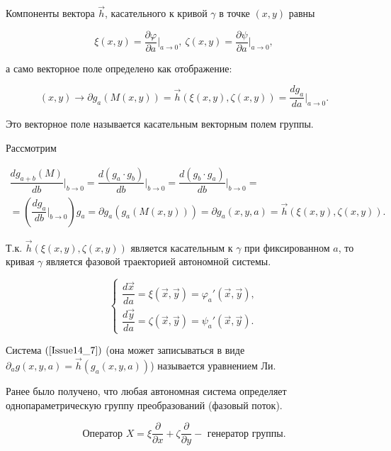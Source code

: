 Компоненты вектора $\vec{h}$, касательного к кривой $\gamma$ в точке $(x,y)$ равны

\[ \xi(x,y) = \dfrac{\partial \varphi}{\partial a}\bigg|_{a \rightarrow 0},\ \zeta(x,y) = \dfrac{\partial \psi }{\partial a}\bigg|_{a \rightarrow 0}, \]

а само векторное поле определено как отображение:

\begin{equation}
	(x,y) \rightarrow \partial g_a(M(x,y)) = \vec{h}(\xi(x,y), \zeta(x,y)) = \dfrac{dg_a}{da}\bigg|_{a \rightarrow 0}.
	\label{Issue14_6}
\end{equation}

Это векторное поле называется $\textbf{касательным векторным полем}$ группы.

Рассмотрим 

\begin{equation}
	\begin{gathered}
		\dfrac{dg_{a+b}(M)}{db}\bigg|_{b\rightarrow 0} = \dfrac{d(g_a\cdot g_b)}{db}\bigg|_{b\rightarrow0} = \dfrac{d(g_b\cdot g_a)}{db}\bigg|_{b\rightarrow 0} = \\
		= \left(\dfrac{dg_a}{db}\bigg|_{b\rightarrow 0}\right)g_a = \partial g_a (g_a(M(x,y))) = \partial g_a (x,y,a) = \vec{h}(\xi(x,y), \zeta(x,y)).
	\end{gathered}
\end{equation}

Т.к. $\vec{h}(\xi(x,y), \zeta(x,y))$ является касательным к $\gamma$ при фиксированном $a$, то кривая $\gamma$ является $\textbf{фазовой траекторией}$ автономной системы.

\begin{equation}
	\begin{cases}
		\dfrac{d\vec{x}}{da} = \xi(\vec{x}, \vec{y}) = \varphi_a'(\vec{x}, \vec{y}), \\
		\dfrac{d\vec{y}}{da} = \zeta(\vec{x}, \vec{y}) = \psi_a'(\vec{x}, \vec{y}).	
	\end{cases}
	\label{Issue14_7}
\end{equation}

Система $(\ref{Issue14_7})$ (она может записываться в виде $\partial_a g(x,y,a) = \vec{h}(g_a(x,y,a))$) называется $\textbf{уравнением Ли}$.

Ранее было получено, что любая автономная система определяет однопараметрическую группу преобразований (фазовый поток).


\begin{equation}
	\text{Оператор } X = \xi \dfrac{\partial}{\partial x} + \zeta \dfrac{\partial}{\partial y} - \text{ генератор группы.}
	\label{Issue14_8}
\end{equation}

